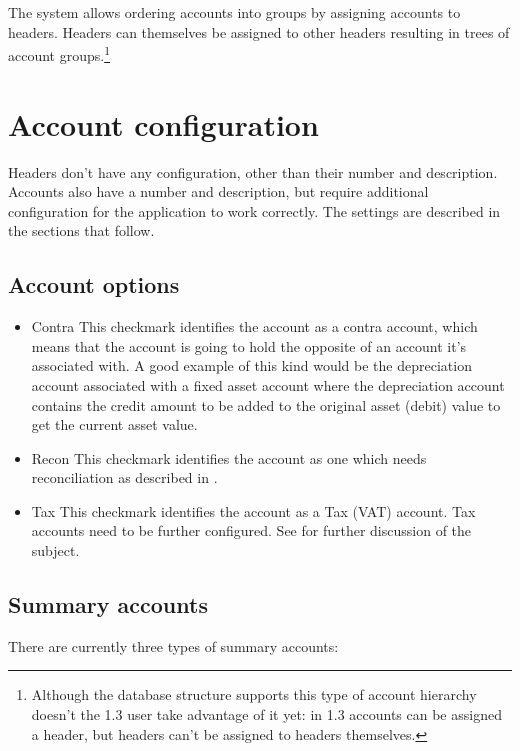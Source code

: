 The system allows ordering accounts into groups by assigning accounts to headers. Headers
can themselves be assigned to other headers resulting in trees of account groups.\footnote{Although the database structure supports this type of account hierarchy
doesn't the 1.3 user take advantage of it yet: in 1.3 accounts can be assigned a header,
but headers can't be assigned to headers themselves.}



\section{Account configuration}
\label{sec-coa-account-configuration}

Headers don't have any configuration, other than their number and description. Accounts also
have a number and description, but require additional configuration for the application to work
correctly. The settings are described in the sections that follow.

\subsection{Account options}
\label{sec-coa-account-options}
\begin{itemize}
\item Contra This checkmark identifies the account as a contra account, which means
   that the account is going to hold the opposite of an account it's associated with.
   A good example of this kind would be the depreciation account associated with a fixed
   asset account where the depreciation account contains the credit amount to be added to
   the original asset (debit) value to get the current asset value.
\item Recon This checkmark identifies the account as one which needs reconciliation as
   described in .
\item Tax This checkmark identifies the account as a Tax (VAT) account. Tax accounts need
   to be further configured. See  for further discussion of the
   subject.
   \label{item:AccountOptionsTax}
\end{itemize}

\subsection{Summary accounts}
\label{subsec-coa-summary-accounts}

There are currently three types of summary accounts:

